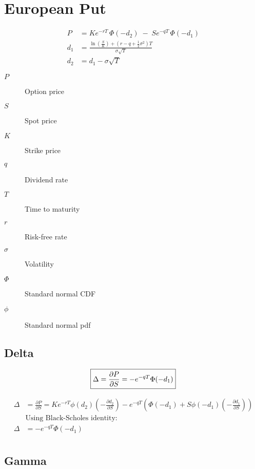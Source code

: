 \documentclass[12pt,a4paper]{article}
\begin{document}
\newpage

\section{European Put}

\[
  \begin{aligned}
    P   & = K e^{-rT}\,\Phi(-d_2) \;-\; S e^{-qT}\,\Phi(-d_1) \\
    d_1 & = \frac{\ln\!\left(\tfrac{S}{K}\right) + (r - q + \tfrac{1}{2}\sigma^2)T}{\sigma \sqrt{T}} \\
    d_2 & = d_1 - \sigma \sqrt{T}
  \end{aligned}
\]

\begin{description}
  \item[$P$] Option price
  \item[$S$] Spot price
  \item[$K$] Strike price
  \item[$q$] Dividend rate
  \item[$T$] Time to maturity
  \item[$r$] Risk-free rate
  \item[$\sigma$] Volatility
  \item[$\Phi$] Standard normal CDF
  \item[$\phi$] Standard normal pdf
\end{description}

\subsection{Delta}

\[
  \boxed{\Delta = \frac{\partial P}{\partial S} = -e^{-qT}\Phi(-d_1)} \\
\]

\[
  \begin{aligned}
    \Delta & = \frac{\partial P}{\partial S} = Ke^{-rT}\phi(d_2)\left(-\frac{\partial d_2}{\partial S}\right) - e^{-qT}\left(\Phi(-d_1) + S\phi(-d_1)\left(-\frac{\partial d_1}{\partial S}\right)\right) \\
    &\text{Using Black-Scholes identity:} \\
    \Delta & = -e^{-qT}\Phi(-d_1) \\
  \end{aligned}
\]

\subsection{Gamma}
\end{document}

